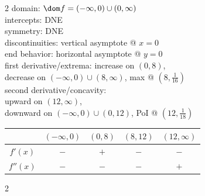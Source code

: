 \documentclass{book}
\begin{document}
\begin{appendices}
\begin{enumerate}[!HW!]
\begin{multicols}{2}
domain: $\dom f = (-\infty,0)\cup(0,\infty)$\\
intercepts: DNE\\
symmetry:  DNE \\ 
discontinuities: vertical asymptote @ $x=0$\\
end behavior: horizontal asymptote @ $y=0$\\ 
first derivative/extrema: increase on $(0,8)$,\\ decrease on $(-\infty,0)\cup (8,\infty)$, max @ $\left(8,\frac{1}{16}\right)$ \\
second derivative/concavity:\\ upward on $(12,\infty)$,\\ downward on $(-\infty, 0)\cup (0,12)$, PoI @ $\left(12,\frac{1}{18}\right)$ \vspace{-15pt}
\begin{center}
\begin{tabular}{c|c|c|c|c}
 & $(-\infty, 0)$ & $(0, 8)$ & $(8, 12)$ & $(12,\infty)$ \\ \hline
$f'(x)$ & $-$ & $+$ & $-$ & $-$ \\ 
$f''(x)$ & $-$ & $-$ & $-$ & $+$\\ 
\end{tabular}
\end{center} 
\end{multicols}

\itemspade \mbox{}\vspace{-25pt}

\begin{multicols}{2}
 \columnbreak


\end{multicols}
\end{enumerate}
\end{appendices}
\end{document}
